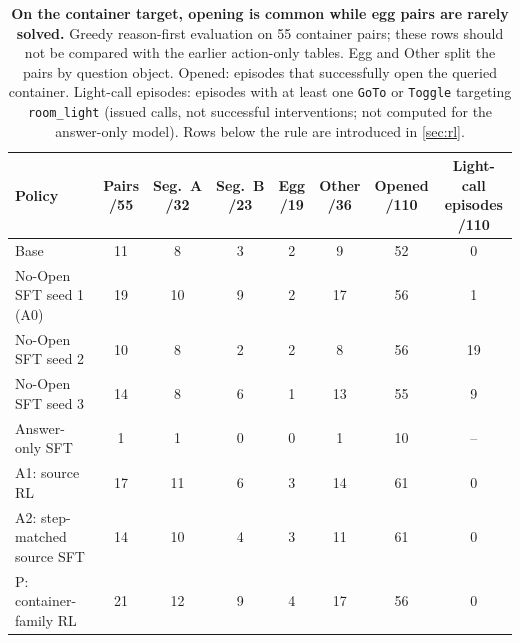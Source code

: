 \documentclass{article}
\begin{document}
\begin{table}[t]
\centering
\caption{\textbf{On the container target, opening is common while egg pairs are rarely solved.} Greedy reason-first evaluation on 55 container pairs; these rows should not be compared with the earlier action-only tables. Egg and Other split the pairs by question object. Opened: episodes that successfully open the queried container. Light-call episodes: episodes with at least one \texttt{GoTo} or \texttt{Toggle} targeting \texttt{room\_light} (issued calls, not successful interventions; not computed for the answer-only model). Rows below the rule are introduced in \cref{sec:rl}.}
\label{tab:target}
\small
\setlength{\tabcolsep}{4.5pt}
\begin{tabular}{lccccccc}
\toprule
Policy & \makecell{Pairs\\/55} & \makecell{Seg.\ A\\/32} & \makecell{Seg.\ B\\/23} & \makecell{Egg\\/19} & \makecell{Other\\/36} & \makecell{Opened\\/110} & \makecell{Light-call\\episodes /110} \\
\midrule
Base & 11 & 8 & 3 & 2 & 9 & 52 & 0 \\
No-Open SFT seed 1 (A0) & 19 & 10 & 9 & 2 & 17 & 56 & 1 \\
No-Open SFT seed 2 & 10 & 8 & 2 & 2 & 8 & 56 & 19 \\
No-Open SFT seed 3 & 14 & 8 & 6 & 1 & 13 & 55 & 9 \\
Answer-only SFT & 1 & 1 & 0 & 0 & 1 & 10 & -- \\
\midrule
A1: source RL & 17 & 11 & 6 & 3 & 14 & 61 & 0 \\
A2: step-matched source SFT & 14 & 10 & 4 & 3 & 11 & 61 & 0 \\
P: container-family RL & 21 & 12 & 9 & 4 & 17 & 56 & 0 \\
\bottomrule
\end{tabular}
\end{table}
\end{document}
